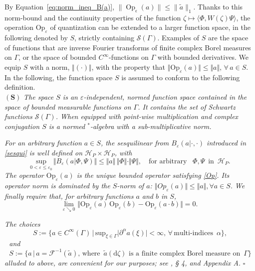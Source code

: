 \documentclass[12pt]{article}
\DeclareMathOperator{\Op}{Op}
\begin{document}
By Equation~\eqref{eq:norm_ineq_B(a)}, $\|\Op_\epsilon(a)\|\leq \|\tilde a\|_1$.
Thanks to this norm-bound and the continuity properties of the function 
$\zeta \mapsto \langle \Phi, W(\zeta)\Psi \rangle$, the operation $\text{Op}_{\varepsilon}$ of quantization 
can be extended to a larger function space, in the following denoted by $S$, strictly containing 
$\mathcal{S}(\Gamma)$. Examples of $S$ are the space of functions that are inverse Fourier transforms 
of finite complex Borel measures on $\Gamma$, or the space of bounded $C^{\infty}$-functions on $\Gamma$ with bounded derivatives. 
We equip $S$ with a norm, $\Vert (\cdot) \Vert$, with the property that 
$\Vert \text{Op}_\varepsilon(a)\Vert\leq \Vert a \Vert, \,\forall \, a \in S.$ In the following, the function space $S$ is
assumed to conform to the following definition.\\

$\mathbf{(S)}$ \textit{The space $S$ is an $\varepsilon$-independent, normed function 
space contained in the space of bounded measurable functions on $\Gamma$. It contains the set of Schwartz functions $\mathcal S(\Gamma)$. When equipped with point-wise multiplication and complex conjugation $S$ is a normed $^{*}$-algebra with a sub-multiplicative norm.}

\textit{For an arbitrary function $a\in S$, the sesquilinear from $B_{\varepsilon}(a|\cdot, \cdot)$ introduced in \eqref{sesqui} is 
well defined on $\mathcal{H}_P\times \mathcal{H}_P$, with
$$\underset{0<\varepsilon\leq \varepsilon_0}{\text{sup}}\, \Vert B_{\varepsilon}(a |\Phi, \Psi) \Vert \leq \Vert a \Vert\,
 \Vert \Phi\Vert\cdot \Vert \Psi \Vert, \quad \text{for arbitrary }\,\,\, \Phi, \Psi \,\text{ in }\, \mathcal{H}_P.$$ 
The operator $\text{Op}_{\varepsilon}(a)$ is the unique bounded operator satisfying \eqref{Op}. Its operator norm is dominated by the $S$-norm of $a$:
$\Vert Op_{\varepsilon}(a) \Vert \leq \Vert a \Vert, \forall a \in S$.}
\textit{We finally require that,
for arbitrary functions $a$ and $b$ in $S$,}
\begin{equation}\label{class lim}
\underset{\varepsilon \searrow 0}{\text{lim}}\,\, \Vert \text{Op}_{\varepsilon}(a)\, \text{Op}_{\varepsilon}(b) - 
\text{Op}_{\varepsilon} (a\cdot b) \Vert = 0.
\end{equation}
 
  \textit{The choices}
 $$S:=\big\{ a\in C^{\infty}(\Gamma)\, \big|\, \text{sup}_{\xi \in \Gamma} \vert \partial^{\alpha} a(\xi)\vert < \infty, \, \forall \, \text{multi-indices }\, \alpha\big\},$$
\,\, \textit{and}
 $$S:= \big\{a \,\big| \, a = \mathcal{F}^{-1} (\tilde{a}), \, \text{where }\,\tilde{a}(\text{d}\zeta) \text{ is a finite complex Borel measure on }\, \Gamma \big\}$$
 \vspace{0.15cm}
\textit{ alluded to above, are convenient for our purposes; see \cite{Zworski}, § 4, and  Appendix A.} \hfill{\large{$\square$}}
\end{document}
